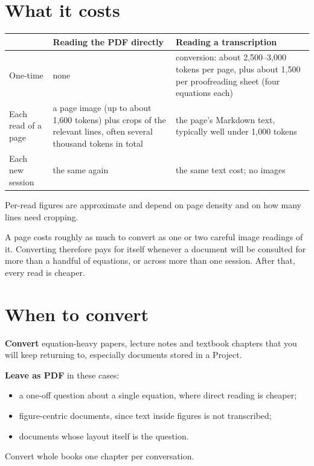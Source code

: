 \documentclass[11pt,a4paper]{article}
\begin{document}
\section{What it costs}
\begin{center}
\small
\begin{tabularx}{\linewidth}{@{}l X X@{}}
\toprule
 & \textbf{Reading the PDF directly} & \textbf{Reading a transcription} \\
\midrule
One-time & none & conversion: about 2{,}500--3{,}000 tokens per page, plus about 1{,}500 per
  proofreading sheet (four equations each) \\
Each read of a page & a page image (up to about 1{,}600 tokens) plus crops of the relevant
  lines, often several thousand tokens in total & the page's Markdown text, typically well
  under 1{,}000 tokens \\
Each new session & the same again & the same text cost; no images \\
\bottomrule
\end{tabularx}
\end{center}
\noindent\textcolor{muted}{\small Per-read figures are approximate and depend on page density
and on how many lines need cropping.}

\medskip
\noindent A page costs roughly as much to convert as one or two careful image readings of it.
Converting therefore pays for itself whenever a document will be consulted for more than a
handful of equations, or across more than one session. After that, every read is cheaper.

\section{When to convert}
\textbf{Convert} equation-heavy papers, lecture notes and textbook chapters that you will keep
returning to, especially documents stored in a Project.

\medskip\noindent\textbf{Leave as PDF} in these cases:
\begin{itemize}
\item a one-off question about a single equation, where direct reading is cheaper;
\item figure-centric documents, since text inside figures is not transcribed;
\item documents whose layout itself is the question.
\end{itemize}
Convert whole books one chapter per conversation.
\end{document}
